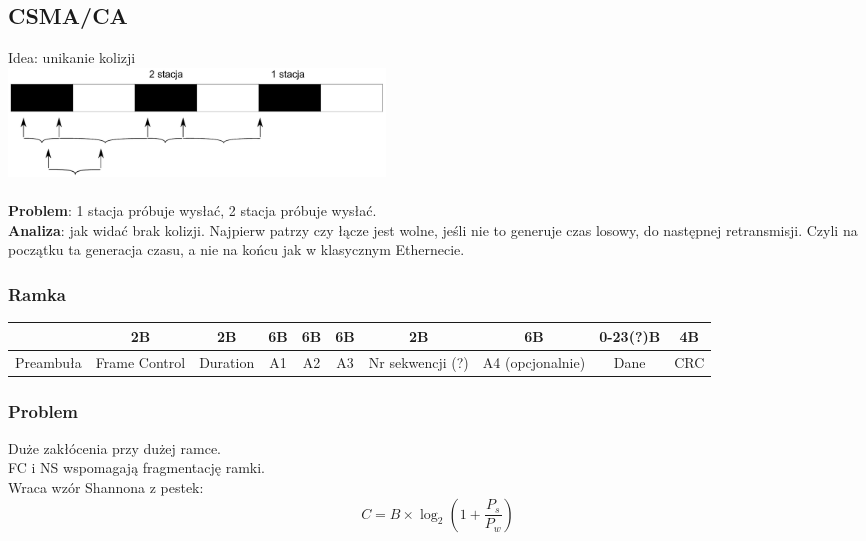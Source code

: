 \documentclass[a4paper,twoside]{article}
\begin{document}
	\subsection{CSMA/CA}
		Idea: unikanie kolizji\\
		\includegraphics[width=10cm]{./images/image22.pdf}\\\\
		\textbf{Problem}: 1 stacja próbuje wysłać, 2 stacja próbuje wysłać.\\
		\textbf{Analiza}: jak widać brak kolizji. Najpierw patrzy czy łącze jest wolne, jeśli nie to generuje czas losowy, do następnej retransmisji. Czyli na początku ta generacja czasu, a nie na końcu jak w klasycznym Ethernecie.
	\subsubsection{Ramka}
		\begin{tabular}{|c|c|c|c|c|c|c|c|c|c|}
			\hline  & 2B & 2B & 6B & 6B & 6B & 2B & 6B & 0-23(?)B & 4B \\ 
			\hline Preambuła & Frame Control & Duration & A1 & A2 & A3 & Nr sekwencji (?) & A4 (opcjonalnie) & Dane & CRC \\ 
			\hline 
		\end{tabular}
	\subsubsection{Problem}
			Duże zakłócenia przy dużej ramce.\\
			FC i NS wspomagają fragmentację ramki.\\
			Wraca wzór Shannona z pestek:\\
			$$ C=B\times \log_2{(1+\frac{P_s}{P_w})} $$
\end{document}
